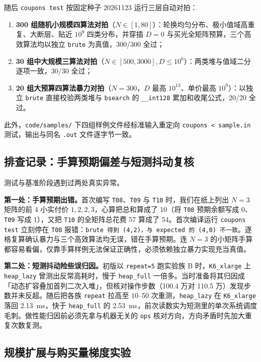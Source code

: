 \documentclass[12pt,a4paper,fontset=windows]{ctexart}
\theoremstyle{plain}
\newcommand{\code}[1]{\texttt{#1}}
\begin{document}
随后 \code{coupons test} 按固定种子 20261123 运行三层自动对拍：
\begin{enumerate}[leftmargin=1.8em,itemsep=0.1em,topsep=0.15em]
  \item \textbf{300 组随机小规模四算法对拍}（$N \in [1, 80]$）：轮换均匀分布、极小值域高重复、大断层、贴近 $10^9$ 四类分布，并穿插 $D=0$ 与买光全矩阵预算，三个高效算法均以独立 \code{brute} 为真值，300/300 全过；
  \item \textbf{30 组中大规模三算法对拍}（$N \in [500, 3000], D \le 10^6$）：两类堆与值域二分逐项一致，30/30 全过；
  \item \textbf{20 组大预算四算法暴力对拍}（$N=300$，$D$ 最高 $10^{13}$、单价最高 $10^9$）：以独立 \code{brute} 直接校验两类堆与 \code{bsearch} 的 \code{\_\_int128} 累加和收尾公式，20/20 全过。
\end{enumerate}

此外，\code{code/samples/} 下四组样例文件经标准输入重定向 \code{coupons < sample.in} 测试，输出与同名 \code{.out} 文件逐字节一致。

\subsection{排查记录：手算预期偏差与短测抖动复核}

测试与基准阶段遇到过两处真实异常。

\textbf{第一处：手算预期出错。}首次编写 \code{T08}、\code{T09} 与 \code{T10} 时，我们在纸上列出 $N=3$ 矩阵的前 4 小实付价 $1,2,2,3$，心算把总和算成了 10（将 \code{T08} 预期余额写成 0、\code{T09} 写成 1），又把 \code{T10} 的全矩阵总花费 57 算成了 54。首次编译运行 \code{coupons test} 立刻停在 \code{T08} 报错：\code{brute 得到 (4,2)，与 expected 的 (4,0) 不一致}。逐格复算确认暴力与三个高效算法均无误，错在手算预期。连 $N=3$ 的小矩阵手算都容易看偏，仅靠手算样例无法保证正确性，必须依赖独立暴力实现充当真值。

\textbf{第二处：短测抖动险些误归因。}初版以 \code{repeat=5} 跑实验族 B 时，\code{K6\_xlarge} 上 \code{heap\_lazy} 曾测出反常高耗时，慢于 \code{heap\_full} 一倍多。当时准备将其归因成「动态扩容叠加首列二次入堆」，但核对操作步数（100.4 万对 110.5 万）发现步数并未反超。随后把各族 \code{repeat} 拉高至 10--50 次重测，\code{heap\_lazy} 在 \code{K6\_xlarge} 落回 2.13~ms，快于 \code{heap\_full} 的 2.53~ms，前次读数实为短测里的单次系统调度毛刺。做性能归因前必须先拿与机器无关的 \code{ops} 核对方向，方向矛盾时先加大重复次数复测。

\subsection{规模扩展与购买量梯度实验}
\end{document}
